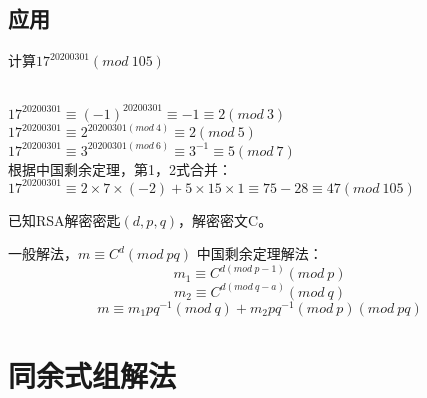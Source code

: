 \documentclass[cn,10pt]{elegantbook}
\begin{document}
\subsection{应用}
\begin{example}
  计算$17^{20200301}(mod\ 105)$
\end{example}
\begin{solution}
  \\ $17^{20200301} \equiv (-1)^{20200301} \equiv -1 \equiv 2(mod\ 3)$
  \\$17^{20200301} \equiv 2^{20200301(mod\ 4)} \equiv 2(mod\ 5)$ 
  \\$17^{20200301} \equiv 3^{20200301(mod\ 6)} \equiv 3^{-1} \equiv 5(mod\ 7)$
  \\根据中国剩余定理，第1，2式合并：
  \\$17^{20200301} \equiv 2 \times 7 \times (-2) + 5 \times 15 \times 1 \equiv 75-28 \equiv 47 (mod\ 105)$
\end{solution}
\vskip 0.5cm
\begin{example}
  已知RSA解密密匙$(d,p,q)$，解密密文C。
\end{example}
\begin{solution}
  一般解法，$m \equiv C^d(mod\ pq)$
  中国剩余定理解法：
    \begin{equation*}
      m_1 \equiv C^{d(mod\ p-1)}(mod\ p)
    \end{equation*}
    \begin{equation*}
      m_2 \equiv C^{d(mod\ q-a)}(mod\ q)
    \end{equation*}
  \begin{equation*}
    m \equiv m_1pq^{-1}(mod\ q)+m_2pq^{-1}(mod\ p)(mod\ pq)
  \end{equation*}
\end{solution}
\section{同余式组解法}
\end{document}
